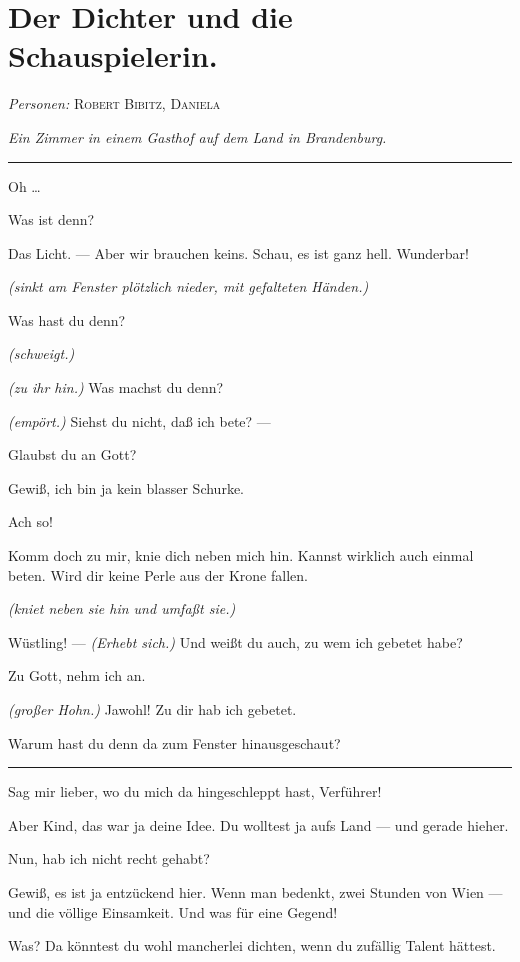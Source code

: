 \documentclass[
	final,
	a4paper,
	ngerman,
	mpinclude = true, %
	twoside = true,
	open = right,
	cleardoublepage = plain,
	DIV = 13,
	BCOR = 1cm,
	titlepage = firstiscover,
	]{scrbook}
\newcommand{\scene}{\section}
\newcommand{\direction}[1]{\textit{(#1)}}
\newcommand{\setting}[1]{\vspace{-0.5\baselineskip}\centering\textit{#1}}
\newenvironment{deletion}{%
		\vspace{0.25\baselineskip}
		\hrule
		\vspace{0.25\baselineskip}
		\color{darkgray}
	}{
		\color{black}
		\vspace{0.25\baselineskip}
		\hrule 
		\vspace{0.25\baselineskip}
	}
\newcommand{\characterlist}[1]{{\begin{center}\textit{Personen:} #1\end{center}}}
\newcommand{\thecharacter}[1]{\textup{\textsc{#1}}\xspace}
\newcommand{\thedichter}{\thecharacter{Robert Bibitz}}
\newcommand{\theschauspielerin}{\thecharacter{Daniela}}
\newcommand{\character}[1]{\item[#1:]}
\newcommand{\dichter}{\character{\thedichter}}
\newcommand{\schauspielerin}{\character{\theschauspielerin}}
\begin{document}
\scene{Der Dichter und die Schauspielerin.}
\characterlist{\thedichter, \theschauspielerin}
\setting{Ein Zimmer in einem Gasthof auf dem Land in Brandenburg.}
\begin{play}
	\begin{deletion}
	\dichter
	Oh \ldots{}

	\schauspielerin
	Was ist denn?

	\dichter
	Das Licht. --- Aber wir brauchen keins. Schau, es ist ganz hell. Wunderbar!

	\schauspielerin
	\direction{sinkt am Fenster plötzlich nieder, mit gefalteten Händen.}

	\dichter
	Was hast du denn?

	\schauspielerin
	\direction{schweigt.}

	\dichter
	\direction{zu ihr hin.} Was machst du denn?

	\schauspielerin
	\direction{empört.} Siehst du nicht, daß ich bete? ---

	\dichter
	Glaubst du an Gott?

	\schauspielerin
	Gewiß, ich bin ja kein blasser Schurke.

	\dichter
	Ach so!

	\schauspielerin
	Komm doch zu mir, knie dich neben mich hin. Kannst wirklich auch einmal beten. Wird dir keine Perle aus der Krone fallen.

	\dichter
	\direction{kniet neben sie hin und umfaßt sie.}

	\schauspielerin
	Wüstling! --- \direction{Erhebt sich.} Und weißt du auch, zu wem ich gebetet habe?

	\dichter
	Zu Gott, nehm ich an.

	\schauspielerin
	\direction{großer Hohn.} Jawohl! Zu dir hab ich gebetet.

	\dichter
	Warum hast du denn da zum Fenster hinausgeschaut?
	\end{deletion}

	\schauspielerin
	Sag mir lieber, wo du mich da hingeschleppt hast, Verführer!

	\dichter
	Aber Kind, das war ja deine Idee. Du wolltest ja aufs Land --- und gerade hieher.

	\schauspielerin
	Nun, hab ich nicht recht gehabt?

	\dichter
	Gewiß, es ist ja entzückend hier. Wenn man bedenkt, zwei Stunden von Wien --- und die völlige Einsamkeit. Und was für eine Gegend!

	\schauspielerin
	Was? Da könntest du wohl mancherlei dichten, wenn du zufällig Talent hättest.


\end{play}
\end{document}

